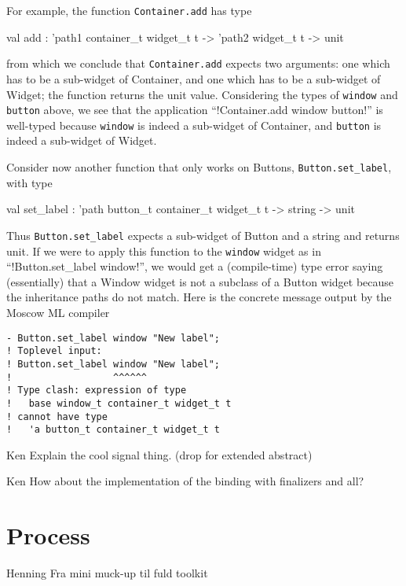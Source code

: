 \documentclass[workingdraft]{usetex-v1}
\begin{document}
For example, the function \texttt{Container.add} has type
\begin{SMLcode}
val add : 'path1 container_t widget_t t
             -> 'path2 widget_t t -> unit
\end{SMLcode}
from which we conclude that \texttt{Container.add} expects two arguments:
one which has to be a sub-widget of Container, and one which has to be
a sub-widget of Widget; the function returns the unit value. Considering
the types of \texttt{window} and \texttt{button} above, we see that
the application
%
``!Container.add window button!''
%
is well-typed because \texttt{window} is indeed a sub-widget of 
Container, and \texttt{button} is indeed a sub-widget of Widget.

Consider now another function that only works on Buttons, \texttt{Button.set\_label}, with type
\begin{SMLcode}
val set_label :
    'path button_t container_t widget_t t
                        -> string -> unit
\end{SMLcode}
Thus \texttt{Button.set\_label} expects a sub-widget of Button and a string and returns unit.
If we were to apply this function to the \texttt{window} widget as in
%
``!Button.set_label window!'',
%
we would get a (compile-time) type error saying (essentially) that
a Window widget is not a subclass of a Button widget because the
inheritance paths do not match. Here is the concrete message output
by the Moscow ML compiler
\begin{verbatim}
- Button.set_label window "New label";
! Toplevel input:
! Button.set_label window "New label";
!                  ^^^^^^
! Type clash: expression of type
!   base window_t container_t widget_t t
! cannot have type
!   'a button_t container_t widget_t t
\end{verbatim}

\begin{ednote}{Ken}
  Explain the cool signal thing.
  (drop for extended abstract)
\end{ednote}

\begin{ednote}{Ken}
  How about the implementation of the binding with finalizers and all?
\end{ednote}


\section{Process}
\label{sec:process}

\begin{ednote}{Henning}
  Fra mini muck-up til fuld toolkit
\end{ednote}
\end{document}
